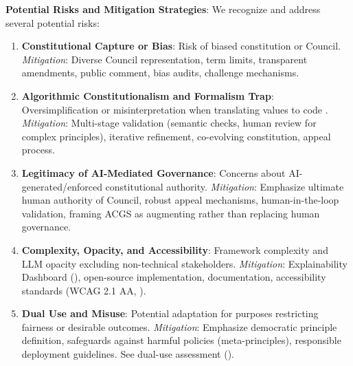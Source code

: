\documentclass[manuscript,screen,9pt]{acmart}
\begin{document}
\textbf{Potential Risks and Mitigation Strategies}:
We recognize and address several potential risks:
\begin{enumerate}[leftmargin=*,itemsep=1pt,parsep=1pt]
    \item \textbf{Constitutional Capture or Bias}: Risk of biased constitution or Council.
        \textit{Mitigation}: Diverse Council representation, term limits, transparent amendments, public comment, bias audits, challenge mechanisms.
    \item \textbf{Algorithmic Constitutionalism and Formalism Trap}: Oversimplification or misinterpretation when translating values to code \cite{Selbst2019FairnessAccountability}.
        \textit{Mitigation}: Multi-stage validation (semantic checks, human review for complex principles), iterative refinement, co-evolving constitution, appeal process.
    \item \textbf{Legitimacy of AI-Mediated Governance}: Concerns about AI-generated/enforced constitutional authority.
        \textit{Mitigation}: \sloppy Emphasize ultimate human authority of Council, robust appeal mechanisms, human-in-the-loop validation, framing ACGS as augmenting rather than replacing human governance. \fussy
    \item \textbf{Complexity, Opacity, and Accessibility}: Framework complexity and LLM opacity excluding non-technical stakeholders.
        \textit{Mitigation}: Explainability Dashboard (), open-source implementation, documentation, accessibility standards (WCAG 2.1 AA, ).
    \item \textbf{Dual Use and Misuse}: Potential adaptation for purposes restricting fairness or desirable outcomes.
        \textit{Mitigation}: \sloppy Emphasize democratic principle definition, safeguards against harmful policies (meta-principles), responsible deployment guidelines. See dual-use assessment (). \fussy
\end{enumerate}
\end{document}
